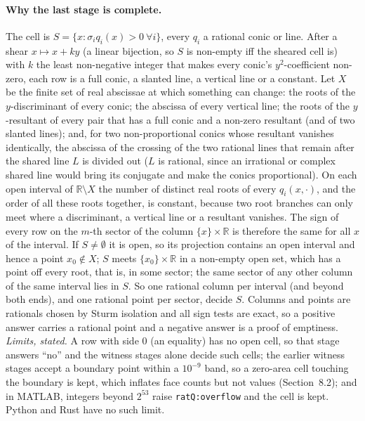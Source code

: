 \documentclass[11pt]{article}
\theoremstyle{definition}
\newcommand{\R}{\mathbb{R}}
\begin{document}
\paragraph{Why the last stage is complete.}
The cell is $S=\{x: \sigma_i q_i(x)>0\ \forall i\}$, every $q_i$ a rational
conic or line. After a shear $x\mapsto x+ky$ (a linear bijection, so $S$ is
non-empty iff the sheared cell is) with $k$ the least non-negative integer that
makes every conic's $y^2$-coefficient non-zero, each row is a full conic, a
slanted line, a vertical line or a constant. Let $X$ be the finite set of real
abscissae at which something can change: the roots of the $y$-discriminant of
every conic; the abscissa of every vertical line; the roots of the
$y$-resultant of every pair that has a full conic and a non-zero resultant
(and of two slanted lines); and, for two non-proportional conics whose
resultant vanishes identically, the abscissa of the crossing of the two
rational lines that remain after the shared line $L$ is divided out ($L$ is
rational, since an irrational or complex shared line would bring its conjugate
and make the conics proportional). On each open interval of $\R\setminus X$
the number of distinct real roots of every $q_i(x,\cdot)$, and the order of all
these roots together, is constant, because two root branches can only meet where
a discriminant, a vertical line or a resultant vanishes. The sign of every row
on the $m$-th sector of the column $\{x\}\times\R$ is therefore the same for
all $x$ of the interval. If $S\neq\emptyset$ it is open, so its projection
contains an open interval and hence a point $x_0\notin X$; $S$ meets
$\{x_0\}\times\R$ in a non-empty open set, which has a point off every root,
that is, in some sector; the same sector of any other column of the same
interval lies in $S$. So one rational column per interval (and beyond both
ends), and one rational point per sector, decide $S$. Columns and points are
rationals chosen by Sturm isolation and all sign tests are exact, so a positive
answer carries a rational point and a negative answer is a proof of emptiness.
\emph{Limits, stated.} A row with side $0$ (an equality) has no open cell, so
that stage answers ``no'' and the witness stages alone decide such cells; the
earlier witness stages accept a boundary point within a $10^{-9}$ band, so a
zero-area cell touching the boundary is kept, which inflates face counts but not
values (Section~8.2); and in MATLAB, integers beyond $2^{53}$ raise
\texttt{ratQ:overflow} and the cell is kept. Python and Rust have no such limit.
\end{document}
